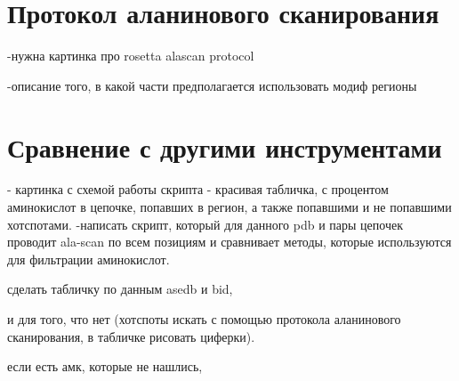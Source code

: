 \newpage
\section{Протокол аланинового сканирования}
-нужна картинка про rosetta alascan protocol 

-описание того, в какой части предполагается использовать модиф регионы
\vspace{10cm}
\section{Сравнение с другими инструментами}
- картинка с схемой работы скрипта
- красивая табличка, с процентом аминокислот в цепочке, попавших в регион, а также попавшими и не попавшими хотспотами.
-написать скрипт, который для данного pdb и пары цепочек проводит ala-scan по всем позициям и сравнивает методы, которые используются для фильтрации аминокислот.

сделать табличку по данным asedb и bid, 

и для того, что нет (хотспоты искать с помощью протокола аланинового сканирования, в табличке рисовать циферки).

если есть амк, которые не нашлись,
\vspace{10cm}



